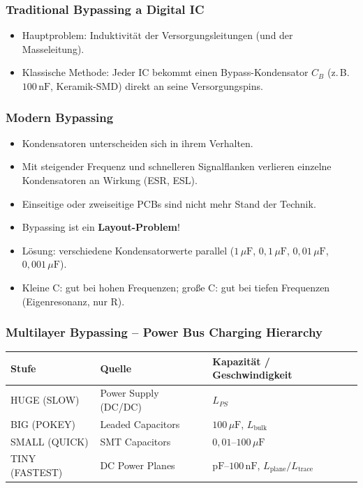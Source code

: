 \documentclass[11pt,a4paper]{article}
\begin{document}
\subsubsection{Traditional Bypassing a Digital IC}
\begin{itemize}
    \item Hauptproblem: Induktivität der Versorgungsleitungen (und der Masseleitung).
    \item Klassische Methode: Jeder IC bekommt einen Bypass-Kondensator $C_B$ (z.\,B. $100\,\text{nF}$, Keramik-SMD) direkt an seine Versorgungspins.
\end{itemize}

\subsubsection{Modern Bypassing}
\begin{itemize}
    \item Kondensatoren unterscheiden sich in ihrem Verhalten.
    \item Mit steigender Frequenz und schnelleren Signalflanken verlieren einzelne Kondensatoren an Wirkung (ESR, ESL).
    \item Einseitige oder zweiseitige PCBs sind nicht mehr Stand der Technik.
    \item Bypassing ist ein \textbf{Layout-Problem}!
    \item Lösung: verschiedene Kondensatorwerte parallel ($1\,\mu\text{F}$, $0{,}1\,\mu\text{F}$, $0{,}01\,\mu\text{F}$, $0{,}001\,\mu\text{F}$).
    \item Kleine C: gut bei hohen Frequenzen; große C: gut bei tiefen Frequenzen (Eigenresonanz, nur R).
\end{itemize}

\subsubsection{Multilayer Bypassing -- Power Bus Charging Hierarchy}
\begin{center}
\begin{tabular}{lll}
    \toprule
    Stufe & Quelle & Kapazität / Geschwindigkeit \\ \midrule
    HUGE (SLOW) & Power Supply (DC/DC) & $L_{PS}$ \\
    BIG (POKEY) & Leaded Capacitors & $100\,\mu\text{F}$, $L_\mathrm{bulk}$ \\
    SMALL (QUICK) & SMT Capacitors & $0{,}01$--$100\,\mu\text{F}$ \\
    TINY (FASTEST) & DC Power Planes & $\mathrm{pF}$--$100\,\text{nF}$, $L_\mathrm{plane}/L_\mathrm{trace}$ \\ \bottomrule
\end{tabular}
\end{center}
\end{document}

